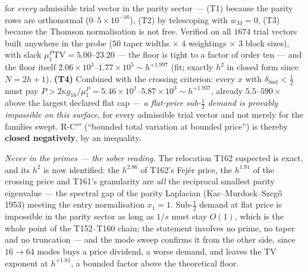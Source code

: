 \documentclass[11pt,a4paper]{article}
\begin{document}
\noindent for \emph{every} admissible trial vector in the parity sector ---
(T1) because the parity rows are orthonormal ($0$--$5\times10^{-16}$), (T2) by
telescoping with $w_M=0$, (T3) because the Thomson normalisation is not free.
Verified on all $1674$ trial vectors built anywhere in the probe ($50$ taper
widths $\times$ $4$ weightings $\times$ $3$ block sizes), with slack
$\mu^P_1\mathrm{TV}=5.00$--$23.20$ --- the floor is tight to a factor of
order ten --- and the floor itself
$2.06\times10^{3}$--$1.77\times10^{5}\sim h^{+1.997}$ (fit; exactly $h^2$ in
closed form since $N=2h+1$). \textbf{(T4)} Combined with the crossing
criterion: every $x$ with $\delta_{\mathrm{bnd}}<\tfrac12$ must pay
$P>2\kappa g_{16}/\mu^P_1=5.46\times10^{1}$--$5.87\times10^{3}\sim
h^{+1.937}$, already $5.5$--$590\times$ above the largest declared flat cap
--- \emph{a flat-price sub-$\tfrac12$ demand is provably impossible on this
surface}, for every admissible trial vector and not merely for the families
swept. R-C$'''$ (``bounded total variation at bounded price'') is thereby
\textbf{closed negatively}, by an inequality.

\emph{Never in the primes --- the sober reading.} The relocation T162
suspected is exact, and its $h^2$ is now identified: the $h^{2.86}$ of T162's
Fej\'er price, the $h^{1.91}$ of the crossing price and T161's granularity
are \emph{all} the reciprocal smallest parity eigenvalue --- the spectral gap
of the parity Laplacian (Kac--Murdock--Szeg\H{o} 1953) meeting the entry
normalisation $x_1=1$. Sub-$\tfrac12$ demand at flat price is impossible in
the parity sector as long as $1/s$ must stay $O(1)$, which is the whole point
of the T152--T160 chain; the statement involves no prime, no taper and no
truncation --- and the mode sweep confirms it from the other side, since
$16\to64$ modes buys a price dividend, a worse demand, and leaves the TV
exponent at $h^{+1.81}$, a bounded factor above the theoretical floor.
\end{document}
